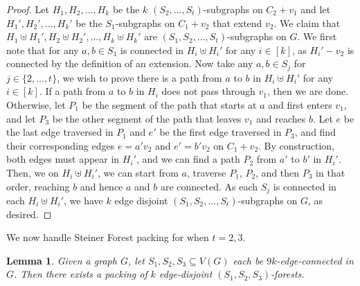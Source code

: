 \documentclass{article}
\newtheorem{lemma}{Lemma}[section]
\begin{document}
\begin{proof}
    Let $H_1,H_2,...,H_k$ be the $k$ $(S_2,...,S_t)$-subgraphs on $C_2+v_1$ and let $H_1',H_2',...,H_k'$ be the $S_1$-subgraphs on $C_1+v_2$ that extend $v_2$. We claim that $H_1 \uplus H_1', H_2 \uplus H_2',..., H_k \uplus H_k'$ are $(S_1,S_2,...,S_t)$-subgraphs on $G$. We first note that for any $a,b \in S_1$ is connected in $H_i \uplus H_i'$ for any $i \in [k]$, as $H_i'-v_2$ is connected by the definition of an extension. Now take any $a,b \in S_j$ for $j \in \{2,...,t\}$, we wish to prove there is a path from $a$ to $b$ in $H_i \uplus H_i'$ for any $i \in [k]$. If a path from $a$ to $b$ in $H_i$ does not pass through $v_1$, then we are done. Otherwise, let $P_1$ be the segment of the path that starts at $a$ and first enters $v_1$, and let $P_3$ be the other segment of the path that leaves $v_1$ and reaches $b$. Let $e$ be the last edge traversed in $P_1$ and $e'$ be the first edge traversed in $P_3$, and find their corresponding edges $e=a'v_2$ and $e'=b'v_2$ on $C_1+v_2$. By construction, both edges must appear in $H_i'$, and we can find a path $P_2$ from $a'$ to $b'$ in $H_i'$. Then, we on $H_i \uplus H_i'$, we can start from $a$, traverse $P_1$, $P_2$, and then $P_3$ in that order, reaching $b$ and hence $a$ and $b$ are connected. As each $S_j$ is connected in each $H_i \uplus H_i'$, we have $k$ edge disjoint $(S_1,S_2,...,S_t)$-subgraphs on $G$, as desired.
\end{proof}

We now handle Steiner Forest packing for when $t=2,3$.

\begin{lemma}
    Given a graph $G$, let $S_1,S_2,S_3 \subseteq V(G)$ each be $9k$-edge-connected in $G$. Then there exists a packing of $k$ edge-disjoint $(S_1,S_2,S_3)$-forests. 
\end{lemma}
\end{document}
